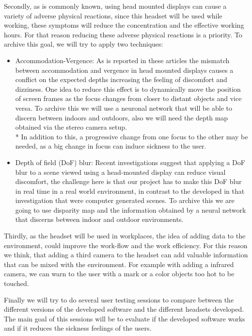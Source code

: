 \documentclass[10pt,a4paper,twocolumn,twoside]{article}
\begin{document}
Secondly, as is commonly known, using head mounted displays can cause a variety of adverse physical reactions, since this headset will be used while working, these symptoms will reduce the concentration and the effective working hours. For that reason reducing these adverse physical reactions is a priority. To archive this goal, we will try to apply two techniques: 

\begin{itemize}
	\item Accommodation-Vergence: As is reported in these\cite{disconfortReview}\cite{vergenceDisconfort} articles the mismatch between accommodation and vergence in head mounted displays causes a conflict on the expected depths increasing the feeling of discomfort and dizziness.  One idea to reduce this effect is to dynamically move the position of screen frames as the focus changes from closer to distant objects and vice versa. To archive this we will use a neuronal network that will be able to discern between indoors and outdoors, also we will need the depth map obtained via the stereo camera setup. \\*
	In addition to this, a progressive change from one focus to the other may be needed, as a big change in focus can induce sickness to the user.
	
	\item Depth of field (DoF) blur: Recent investigations\cite{ifftConfortDoF} suggest that applying a DoF blur to a scene viewed using a head-mounted display can reduce visual discomfort, the challenge here is that our project has to make this DoF blur in real time in a real world environment, in contrast to the developed in that investigation that were computer generated scenes. To archive this we are going to use disparity map and the information obtained by a neural network that discerns between indoor and outdoor environments.
\end{itemize} 

Thirdly, as the headset will be used in workplaces, the idea of adding data to the environment, could improve the work-flow and the work efficiency. For this reason we think, that adding a third camera to the headset can add valuable information that can be mixed with the environment. For example with adding a infrared camera, we can warn to the user with a mark or a color objects too hot to be touched.

Finally we will try to do several user testing sessions to compare between the different versions of the developed software and the different headsets developed. The main goal of this sessions will be to evaluate if the developed software works and if it reduces the sickness feelings of the users.
\end{document}
